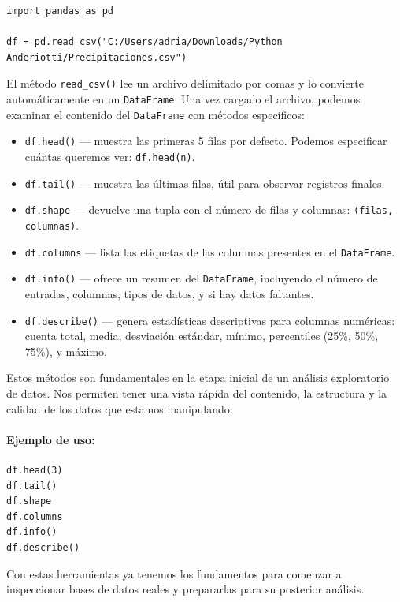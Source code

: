 \documentclass{article}
\theoremstyle{nonumberplain}
\begin{document}
\begin{verbatim}
import pandas as pd

df = pd.read_csv("C:/Users/adria/Downloads/Python Anderiotti/Precipitaciones.csv")
\end{verbatim}

El método \texttt{read\_csv()} lee un archivo delimitado por comas y lo convierte automáticamente en un \texttt{DataFrame}. Una vez cargado el archivo, podemos examinar el contenido del \texttt{DataFrame} con métodos específicos:

\begin{itemize}
    \item \texttt{df.head()} — muestra las primeras 5 filas por defecto. Podemos especificar cuántas queremos ver: \texttt{df.head(n)}.
    \item \texttt{df.tail()} — muestra las últimas filas, útil para observar registros finales.
    \item \texttt{df.shape} — devuelve una tupla con el número de filas y columnas: \texttt{(filas, columnas)}.
    \item \texttt{df.columns} — lista las etiquetas de las columnas presentes en el \texttt{DataFrame}.
    \item \texttt{df.info()} — ofrece un resumen del \texttt{DataFrame}, incluyendo el número de entradas, columnas, tipos de datos, y si hay datos faltantes.
    \item \texttt{df.describe()} — genera estadísticas descriptivas para columnas numéricas: cuenta total, media, desviación estándar, mínimo, percentiles (25\%, 50\%, 75\%), y máximo.
\end{itemize}

Estos métodos son fundamentales en la etapa inicial de un análisis exploratorio de datos. Nos permiten tener una vista rápida del contenido, la estructura y la calidad de los datos que estamos manipulando.

\paragraph{Ejemplo de uso:}

\begin{verbatim}
df.head(3)
df.tail()
df.shape
df.columns
df.info()
df.describe()
\end{verbatim}

Con estas herramientas ya tenemos los fundamentos para comenzar a inspeccionar bases de datos reales y prepararlas para su posterior análisis.
\end{document}
